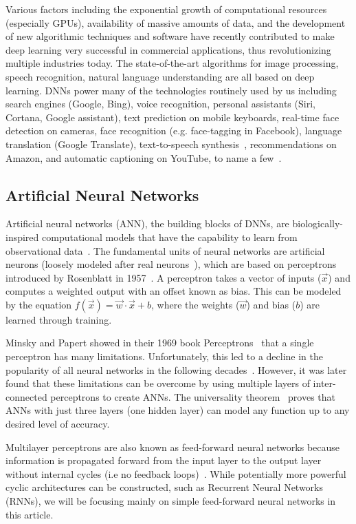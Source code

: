 \documentclass[aps,prd,%
amsmath,floats,floatfix, twocolumn, superscriptaddress,nofootinbib,showpacs]{revtex4-1}
\begin{document}
Various factors including the exponential growth of computational resources (especially GPUs), availability of massive amounts of data, and the development of new algorithmic techniques and software have recently contributed to make deep learning very successful in commercial applications, thus revolutionizing multiple industries today. The state-of-the-art algorithms for image processing, speech recognition, natural language understanding are all based on deep learning. DNNs power many of the technologies routinely used by us including search engines (Google, Bing), voice recognition, personal assistants (Siri, Cortana, Google assistant), text prediction on mobile keyboards, real-time face detection on cameras, face recognition (e.g. face-tagging in Facebook), language translation (Google Translate), text-to-speech synthesis~\cite{WaveNet}, recommendations on Amazon, and automatic captioning on YouTube, to name a few~\cite{BigDataAI}.


\subsection*{Artificial Neural Networks}

Artificial neural networks (ANN), the building blocks of DNNs, are biologically-inspired computational models that have the capability to learn from observational data~\cite{DNN-Book}. The fundamental units of neural networks are artificial neurons (loosely modeled after real neurons~\cite{ann2003}), which are based on perceptrons introduced by Rosenblatt in 1957~\cite{Perceptron}. A perceptron takes a vector of inputs ($\vec{x}$) and computes a weighted output with an offset known as bias. This can be modeled by the equation $f(\vec{x})=\vec{w} \cdot \vec{x}+b$, where the weights ($\vec{w}$) and bias ($b$) are learned through training.

Minsky and Papert showed in their 1969 book Perceptrons~\cite{MinskyBook} that a single perceptron has many limitations. Unfortunately, this led to a decline in the popularity of all neural networks in the following decades~\cite{DL-Review}. However, it was later found that these limitations can be overcome by using multiple layers of inter-connected perceptrons to create ANNs. The universality theorem~\cite{UnivTheorem} proves that ANNs with just three layers (one hidden layer) can model any function up to any desired level of accuracy.

Multilayer perceptrons are also known as feed-forward neural networks because information is propagated forward from the input layer to the output layer without internal cycles (i.e no feedback loops)~\cite{DL-Book}. While potentially more powerful cyclic architectures can be constructed, such as Recurrent Neural Networks (RNNs), we will be focusing mainly on simple feed-forward neural networks in this article. 
\end{document}

